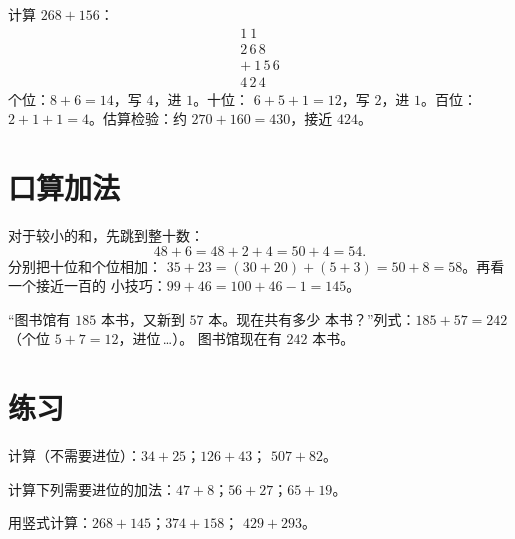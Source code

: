\begin{example}\label{ex:g2:addition:worked}
计算 $268 + 156$：
\[
\begin{array}{r}
{\scriptstyle 1}\ {\scriptstyle 1}\ \phantom{0} \\[-3pt]
2\,6\,8 \\
+\ 1\,5\,6 \\
\hline
4\,2\,4
\end{array}
\]
个位：$8 + 6 = 14$，写 $4$，进 $1$。十位：
$6 + 5 + 1 = 12$，写 $2$，进 $1$。百位：
$2 + 1 + 1 = 4$。估算检验：约 $270 + 160 = 430$，接近
$424$。\checkmark
\end{example}

\section{口算加法}

\begin{example}[凑十法]\label{ex:g2:addition:mental}
对于较小的和，先跳到整十数：
\[
48 + 6 = 48 + 2 + 4 = 50 + 4 = 54 .
\]
分别把十位和个位相加：
$35 + 23 = (30 + 20) + (5 + 3) = 50 + 8 = 58$。再看一个接近一百的
小技巧：$99 + 46 = 100 + 46 - 1 = 145$。
\end{example}

\begin{example}[一道小题]\label{ex:g2:addition:problem}
“图书馆有 $185$ 本书，又新到 $57$ 本。现在共有多少
本书？”列式：$185 + 57 = 242$（个位 $5 + 7 = 12$，进位\,\dots）。
图书馆现在有 $242$ 本书。
\end{example}

\section{练习}

\begin{exercise}[$\star$]\label{exo:g2:addition:1}
计算（不需要进位）：$34 + 25$；\quad $126 + 43$；\quad
$507 + 82$。
\end{exercise}

\begin{exercise}[$\star$]\label{exo:g2:addition:2}
计算下列需要进位的加法：$47 + 8$；\quad $56 + 27$；\quad $65 + 19$。
\end{exercise}

\begin{exercise}[$\star$]\label{exo:g2:addition:3}
用竖式计算：$268 + 145$；\quad $374 + 158$；\quad
$429 + 293$。
\end{exercise}

